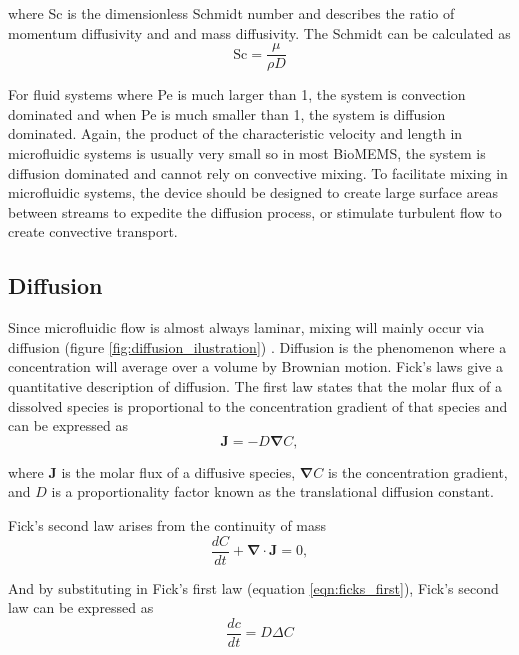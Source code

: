 \noindent where Sc is the dimensionless Schmidt number and describes the ratio of momentum diffusivity and and mass diffusivity. The Schmidt can be calculated as
\begin{equation}
    \text{Sc} = \frac{\mu}{\rho D}
\end{equation}

\par For fluid systems where Pe is much larger than 1, the system is convection dominated and when Pe is much smaller than 1, the system is diffusion dominated. Again, the product of the characteristic velocity and length in microfluidic systems is usually very small so in most BioMEMS, the system is diffusion dominated and cannot rely on convective mixing. To facilitate mixing in microfluidic systems, the device should be designed to create large surface areas between streams to expedite the diffusion process, or stimulate turbulent flow to create convective transport.


\subsection*{Diffusion}

\par Since microfluidic flow is almost always laminar, mixing will mainly occur via diffusion (figure \ref{fig:diffusion_ilustration}) \cite{david_j._beebe_physics_2002}. Diffusion is the phenomenon where a concentration will average over a volume by Brownian motion. Fick's laws give a quantitative description of diffusion. The first law states that the molar flux of a dissolved species is proportional to the concentration gradient of that species and can be expressed as 
\begin{equation}
    \boldsymbol{J} = -D \boldsymbol{\nabla}C,
    \label{eqn:ficks_first}
\end{equation}

\noindent where $\boldsymbol{J}$ is the molar flux of a diffusive species, $\boldsymbol{\nabla}C$ is the concentration gradient, and $D$ is a proportionality factor known as the translational diffusion constant.

\par Fick's second law arises from the continuity of mass
\begin{equation}
    \frac{dC}{dt} + \boldsymbol{\nabla} \cdot \boldsymbol{J} = 0,
\end{equation}

\noindent And by substituting in Fick's first law (equation \ref{eqn:ficks_first}), Fick's second law can be expressed as 
\begin{equation}
    \frac{dc}{dt} = D\Delta C
    \label{eqn:ficks_second}
\end{equation}


